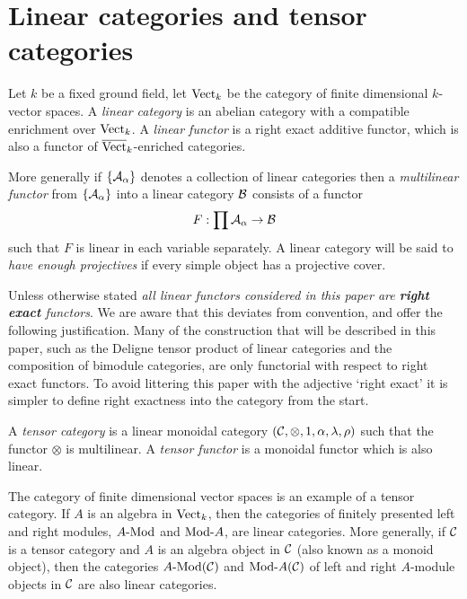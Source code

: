 \documentclass{amsart}
\begin{document}
\section{Linear categories and tensor categories} \label{sec-tc-lincat}

	Let $k$ be a fixed ground field, let $\mathrm{Vect}_k$ be the category of finite dimensional $k$-vector spaces.   A {\em linear category} is an abelian category with a compatible enrichment over ${\mathrm{Vect}}_k$. 
A {\em linear functor} is a right exact additive functor, which is also a functor of $\overline{\mathrm{Vect}}_k$-enriched categories. 
	
More generally if $\{\mathcal A_\alpha\}$ denotes a collection of linear categories then a {\em multilinear functor} from $\{\mathcal A_\alpha\}$ into a linear category $\mathcal B$ consists of a functor
\begin{equation*}
	F: \prod \mathcal A_\alpha \to \mathcal B
\end{equation*}
such that $F$ is linear in each variable separately. A linear category will be said to {\em have enough projectives} if every simple object has a projective cover. 

\begin{warning}
	Unless otherwise stated {\em all linear functors considered in this paper are {\bf right exact} functors}.  We are aware that this deviates from convention, and offer the following justification. Many of the construction that will be described in this paper, such as the Deligne tensor product of linear categories and the composition of bimodule categories, are only functorial with respect to right exact functors. To avoid littering this paper with the adjective `right exact' it is simpler to define right exactness into the category from the start.  
\end{warning}

\begin{definition}
	A {\em tensor category} is a linear monoidal category $(\mathcal C, \otimes, 1, \alpha, \lambda, \rho)$ such that the functor $\otimes$ is multilinear. A {\em tensor functor} is a monoidal functor which is also linear.
\end{definition}

\begin{example}
	The category of finite dimensional vector spaces is an example of a tensor category. If $A$ is an algebra in $\mathrm{Vect}_k$, then the categories of finitely presented left and right modules, $\Mod{A}{}$ and $\Mod{}{A}$, are linear categories. More generally, if $\mathcal C$ is a tensor category and $A$ is an algebra object in $\mathcal C$ (also known as a monoid object), then the categories $\Mod{A}{}(\cC)$ and $\Mod{}{A}(\cC)$ of left and right $A$-module objects in $\mathcal C$ are also linear categories.
\end{example}
\end{document}

